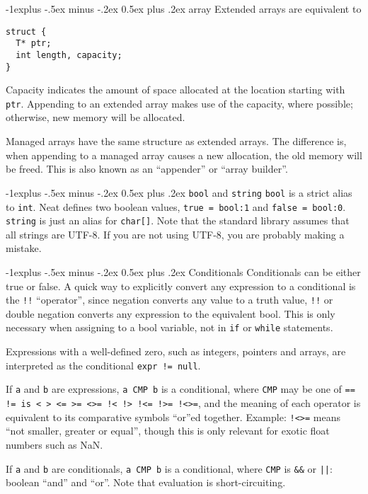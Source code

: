 \documentclass[a4paper,10pt,landscape]{article}
\makeatletter
\newenvironment{segment}[1]
{\begin{mdframed}[roundcorner=5pt]\subsection{#1}}
{\end{mdframed}\vspace{2pt plus 5pt}}
\renewcommand{\subsection}{\@startsection{subsection}{2}{0mm}%
			      {-1explus -.5ex minus -.2ex}%
			      {0.5ex plus .2ex}%
			      {\normalfont\normalsize\bfseries}}
\makeatother
\begin{document}
\begin{multicols}{3}
\begin{segment}{array}
Extended arrays are equivalent to
\begin{lstlisting}
struct {
  T* ptr;
  int length, capacity;
}
\end{lstlisting}

Capacity indicates the amount of space allocated at the location starting with \texttt{ptr}.
Appending to an extended array makes use of the capacity, where possible; otherwise, new memory
will be allocated.

Managed arrays have the same structure as extended arrays. The difference is, when appending to a managed
array causes a new allocation, the old memory will be freed. This is also known as an
\enquote{appender} or \enquote{array builder}.

\end{segment}

\begin{segment}{\texttt{bool} and \texttt{string}}
\texttt{bool} is a strict alias to \texttt{int}. Neat defines two boolean values,
\texttt{true = bool:1} and \texttt{false = bool:0}.\\
\texttt{string} is just an alias for \texttt{char[]}. Note that the standard library assumes
that all strings are UTF-8. If you are not using UTF-8, you are probably making a mistake.
\end{segment}

\begin{segment}{Conditionals}
Conditionals can be either true or false. A quick way to explicitly convert any expression to a
conditional is the \texttt{!!} \enquote{operator}, since negation converts any value to a truth value,
\texttt{!!} or double negation converts any expression to the equivalent bool. This is only necessary
when assigning to a bool variable, not in \texttt{if} or \texttt{while} statements.

Expressions with a well-defined zero, such as integers, pointers and arrays, are interpreted as
the conditional \texttt{expr != null}.

If \texttt{a} and \texttt{b} are expressions, \texttt{a CMP b} is a conditional, where
\texttt{CMP} may be one of \texttt{== != is < > <= >= <>= !< !> !<= !>= !<>=}, and the meaning of each
operator is equivalent to its comparative symbols \enquote{or}ed together. Example: \texttt{!<>=} means
\enquote{not smaller, greater or equal}, though this is only relevant for
exotic float numbers such as NaN.

If \texttt{a} and \texttt{b} are conditionals, \texttt{a CMP b} is a conditional, where \texttt{CMP}
is \texttt{\&\&} or \texttt{||}: boolean \enquote{and} and \enquote{or}. Note that evaluation is short-circuiting.


\end{segment}
\end{multicols}
\end{document}
